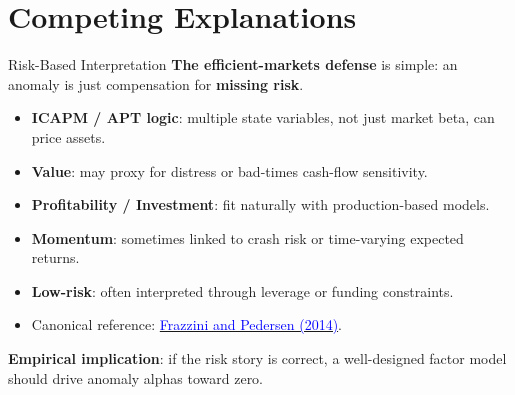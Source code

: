 \documentclass{beamer}
\begin{document}
\section{Competing Explanations}

\begin{frame}{Risk-Based Interpretation}
	\textbf{The efficient-markets defense} is simple: an anomaly is just compensation for \textbf{missing risk}.

	\vspace{0.2cm}
	\begin{itemize}
		\item \textbf{ICAPM / APT logic}: multiple state variables, not just market beta, can price assets.
		\item \textbf{Value}: may proxy for distress or bad-times cash-flow sensitivity.
		\item \textbf{Profitability / Investment}: fit naturally with production-based models.
		\item \textbf{Momentum}: sometimes linked to crash risk or time-varying expected returns.
		\item \textbf{Low-risk}: often interpreted through leverage or funding constraints.
		\item Canonical reference: \href{https://doi.org/10.1016/j.jfineco.2013.10.005}{\textcolor{blue}{Frazzini and Pedersen (2014)}}.
	\end{itemize}

	\vspace{0.3cm}
	\textbf{Empirical implication}: if the risk story is correct, a well-designed factor model should drive anomaly alphas toward zero.
\end{frame}
\end{document}
